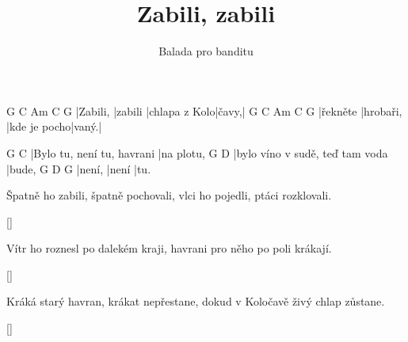 \documentclass{song}
\title{Zabili, zabili}
\author{Balada pro banditu}
\begin{document}
\strophe
G        C       Am            C     G
|Zabili, |zabili |chlapa z Kolo|čavy,|
G        C         Am           C     G
|řekněte |hrobaři, |kde je pocho|vaný.|
\endstrophe

G                          C
|Bylo tu, není tu, havrani |na plotu,
G                               D
|bylo víno v sudě, teď tam voda |bude,
G      D     G
|není, |není |tu.
\endstrophe

\strophe*
Špatně ho zabili, špatně pochovali,
vlci ho pojedli, ptáci rozklovali.
\endstrophe

\ref{}

\strophe*
Vítr ho roznesl po dalekém kraji,
havrani pro něho po poli krákají.
\endstrophe

\ref{}

\strophe*
Kráká starý havran, krákat nepřestane,
dokud v Koločavě živý chlap zůstane.
\endstrophe

\ref{}
\end{document}
